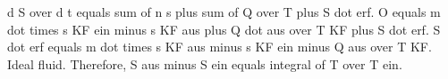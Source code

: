d S over d t equals sum of n s plus sum of Q over T plus S dot erf.  
O equals m dot times s KF ein minus s KF aus plus Q dot aus over T KF plus S dot erf.  
S dot erf equals m dot times s KF aus minus s KF ein minus Q aus over T KF.  
Ideal fluid.  
Therefore, S aus minus S ein equals integral of T over T ein.